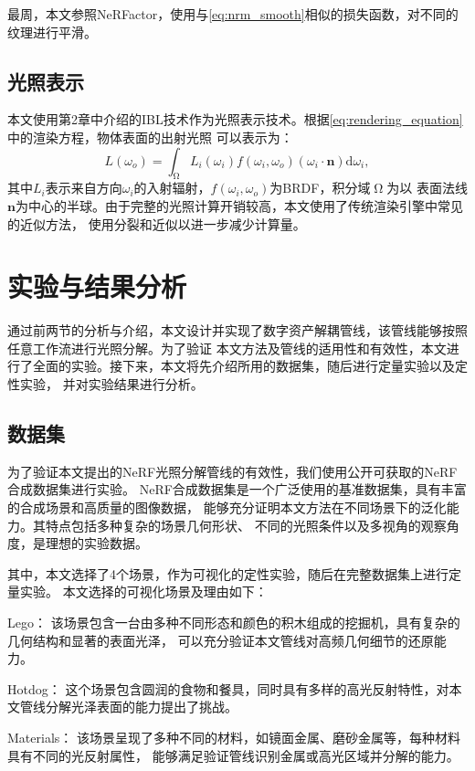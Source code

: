 最周，本文参照NeRFactor\cite{zhang2021nerfactor}，使用与\ref{eq:nrm_smooth}相似的损失函数，对不同的纹理进行平滑。

\subsection{光照表示}
本文使用第2章中介绍的IBL技术作为光照表示技术。根据\eqref{eq:rendering_equation}中的渲染方程，物体表面的出射光照
可以表示为：
\begin{equation}
  \label{eq:radiance}
  L\left(\omega_o\right)=\int_{\upOmega} L_i\left(\omega_i\right)f\left(\omega_i,\omega_o\right)\left(\omega_i\cdot\mathbf{n}\right)\mathrm{d}\omega_i,
\end{equation}
其中$L_i$表示来自方向$\omega_i$的入射辐射，$f\left(\omega_i,\omega_o\right)$为BRDF，积分域$\upOmega$为以
表面法线$\mathbf{n}$为中心的半球。由于完整的光照计算开销较高，本文使用了传统渲染引擎中常见的近似方法\cite{Hill_2014}，
使用分裂和近似以进一步减少计算量。

\section{实验与结果分析}
通过前两节的分析与介绍，本文设计并实现了数字资产解耦管线，该管线能够按照任意工作流进行光照分解。为了验证
本文方法及管线的适用性和有效性，本文进行了全面的实验。接下来，本文将先介绍所用的数据集，随后进行定量实验以及定性实验，
并对实验结果进行分析。
\subsection{数据集}

为了验证本文提出的NeRF光照分解管线的有效性，我们使用公开可获取的NeRF合成数据集进行实验。
NeRF合成数据集是一个广泛使用的基准数据集，具有丰富的合成场景和高质量的图像数据，
能够充分证明本文方法在不同场景下的泛化能力。其特点包括多种复杂的场景几何形状、
不同的光照条件以及多视角的观察角度，是理想的实验数据。

其中，本文选择了4个场景，作为可视化的定性实验，随后在完整数据集上进行定量实验。
本文选择的可视化场景及理由如下：

 Lego：
该场景包含一台由多种不同形态和颜色的积木组成的挖掘机，具有复杂的几何结构和显著的表面光泽，
可以充分验证本文管线对高频几何细节的还原能力。

 Hotdog：
这个场景包含圆润的食物和餐具，同时具有多样的高光反射特性，对本文管线分解光泽表面的能力提出了挑战。

 Materials：
该场景呈现了多种不同的材料，如镜面金属、磨砂金属等，每种材料具有不同的光反射属性，
能够满足验证管线识别金属或高光区域并分解的能力。

